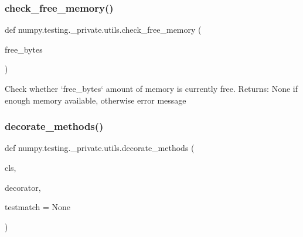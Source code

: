 \subsubsection{\texorpdfstring{check\+\_\+free\+\_\+memory()}{check\_free\_memory()}}
{\footnotesize\ttfamily def numpy.\+testing.\+\_\+private.\+utils.\+check\+\_\+free\+\_\+memory (\begin{DoxyParamCaption}\item[{}]{free\+\_\+bytes }\end{DoxyParamCaption})}

\begin{DoxyVerb}Check whether `free_bytes` amount of memory is currently free.
Returns: None if enough memory available, otherwise error message
\end{DoxyVerb}
 \mbox{\label{namespacenumpy_1_1testing_1_1__private_1_1utils_ab3485b0cc46433a51e48bb37e97ea91e}} 
\subsubsection{\texorpdfstring{decorate\+\_\+methods()}{decorate\_methods()}}
{\footnotesize\ttfamily def numpy.\+testing.\+\_\+private.\+utils.\+decorate\+\_\+methods (\begin{DoxyParamCaption}\item[{}]{cls,  }\item[{}]{decorator,  }\item[{}]{testmatch = {\ttfamily None} }\end{DoxyParamCaption})}

